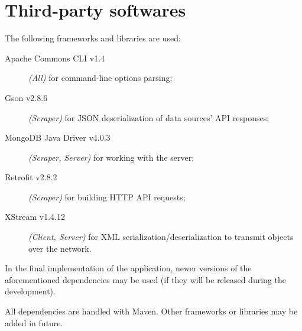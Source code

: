 \section{Third-party softwares}\label{sec:dependencies}

The following frameworks and libraries are used:
\begin{description}
	\item[Apache Commons CLI v1.4] \textit{(All)} for command-line options
		parsing;
	\item[Gson v2.8.6] \textit{(Scraper)} for JSON deserialization of data
		sources' API responses;
	\item[MongoDB Java Driver v4.0.3] \textit{(Scraper, Server)} for
		working with the \mongodb{} server;
	\item[Retrofit v2.8.2] \textit{(Scraper)} for building HTTP API
		requests;
	\item[XStream v1.4.12] \textit{(Client, Server)} for XML
		serialization/deserialization to transmit objects over the
		network.
\end{description}

In the final implementation of the application, newer versions of the
aforementioned dependencies may be used (if they will be released during the
development).

All dependencies are handled with Maven. Other frameworks or libraries may be
added in future.
